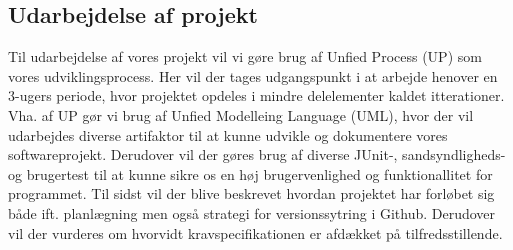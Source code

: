 \documentclass[../main.tex]{subfiles}
\begin{document}
\begin{flushleft}
\subsection{Udarbejdelse af projekt}
Til udarbejdelse af vores projekt vil vi gøre brug af Unfied Process (UP) som vores udviklingsprocess. Her vil der tages udgangspunkt i at arbejde henover en 3-ugers periode, hvor projektet opdeles i mindre delelementer kaldet itterationer. Vha. af UP gør vi brug af Unfied Modelleing Language (UML), hvor der vil udarbejdes diverse artifaktor til at kunne udvikle og dokumentere vores softwareprojekt. Derudover vil der gøres brug af diverse JUnit-, sandsyndligheds- og brugertest til at kunne sikre os en høj brugervenlighed og funktionallitet for programmet. Til sidst vil der blive beskrevet hvordan projektet har forløbet sig både ift. planlægning men også strategi for versionssytring i Github. Derudover vil der vurderes om hvorvidt kravspecifikationen er afdækket på tilfredsstillende.


\end{flushleft}
\end{document}
